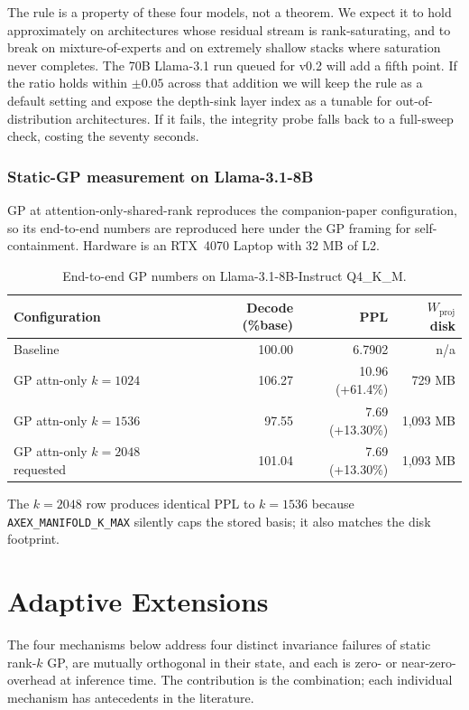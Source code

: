 \documentclass[11pt]{article}
\begin{document}
The rule is a property of these four models, not a theorem. We expect
it to hold approximately on architectures whose residual stream is
rank-saturating, and to break on mixture-of-experts and on extremely
shallow stacks where saturation never completes. The 70B Llama-3.1
run queued for v0.2 will add a fifth point. If the ratio holds within
$\pm 0.05$ across that addition we will keep the rule as a default
setting and expose the depth-sink layer index as a tunable for
out-of-distribution architectures. If it fails, the integrity probe
falls back to a full-sweep check, costing the seventy seconds.

\section{Static-GP measurement on Llama-3.1-8B}
\label{sec:anchor}
GP at attention-only-shared-rank reproduces the companion-paper
configuration, so its end-to-end numbers are reproduced here under the
GP framing for self-containment. Hardware is an RTX~4070 Laptop with
$32$ MB of L2.

\begin{table}[h]\centering\small
\caption{End-to-end GP numbers on Llama-3.1-8B-Instruct Q4\_K\_M.}
\begin{tabular}{@{}lrrr@{}}
\toprule
Configuration & Decode (\%base) & PPL & $W_\text{proj}$ disk \\
\midrule
Baseline & 100.00 & 6.7902 & n/a \\
GP attn-only $k{=}1024$ & 106.27 & 10.96 (+61.4\%) & 729 MB \\
GP attn-only $k{=}1536$ & 97.55  & 7.69 (+13.30\%) & 1{,}093 MB \\
GP attn-only $k{=}2048$ requested & 101.04 & 7.69 (+13.30\%) & 1{,}093 MB \\
\bottomrule
\end{tabular}
\end{table}

The $k{=}2048$ row produces identical PPL to $k{=}1536$ because
\texttt{AXEX\_MANIFOLD\_K\_MAX} silently caps the stored basis; it
also matches the disk footprint.

\part{Adaptive Extensions}

The four mechanisms below address four distinct invariance failures of
static rank-$k$ GP, are mutually orthogonal in their state, and each is
zero- or near-zero-overhead at inference time.  The contribution is the
combination; each individual mechanism has antecedents in the
literature.
\end{document}

